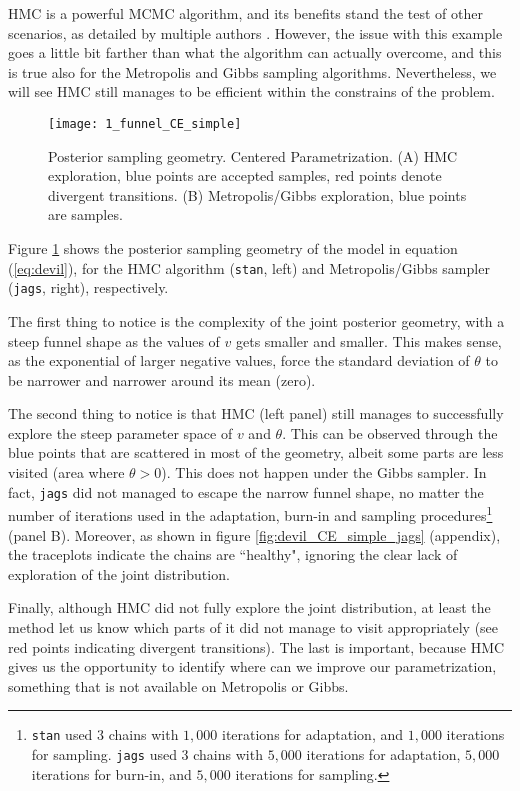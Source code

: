 HMC is a powerful MCMC algorithm, and its benefits stand the test of other scenarios, as detailed by multiple authors \cite{McElreath_2020, Gelman_et_al_2014}. However, the issue with this example goes a little bit farther than what the algorithm can actually overcome, and this is true also for the Metropolis and Gibbs sampling algorithms. Nevertheless, we will see HMC still manages to be efficient within the constrains of the problem.
%
\begin{figure}[h]
	\centering
	\texttt{[image: 1\_funnel\_CE\_simple]}
	\caption[Posterior sampling geometry. Centered Parametrization.]%
	{Posterior sampling geometry. Centered Parametrization. (A) HMC exploration, blue points are accepted samples, red points denote divergent transitions. (B) Metropolis/Gibbs exploration, blue points are samples.}
	\label{fig:devil_CE_geom}
\end{figure}

Figure \ref{fig:devil_CE_geom} shows the posterior sampling geometry of the model in equation (\ref{eq:devil}), for the HMC algorithm (\texttt{stan}, left) and Metropolis/Gibbs sampler (\texttt{jags}, right), respectively. 

The first thing to notice is the complexity of the joint posterior geometry, with a steep funnel shape as the values of $v$ gets smaller and smaller. This makes sense, as the exponential of larger negative values, force the standard deviation of $\theta$ to be narrower and narrower around its mean (zero). 

The second thing to notice is that HMC (left panel) still manages to successfully explore the steep parameter space of $v$ and $\theta$. This can be observed through the blue points that are scattered in most of the geometry, albeit some parts are less visited (area where $\theta>0$). This does not happen under the Gibbs sampler. In fact, \texttt{jags} did not managed to escape the narrow funnel shape, no matter the number of iterations used in the adaptation, burn-in and sampling procedures\footnote{\texttt{stan} used $3$ chains with $1,000$ iterations for adaptation, and $1,000$ iterations for sampling. \texttt{jags} used $3$ chains with $5,000$ iterations for adaptation, $5,000$ iterations for burn-in, and $5,000$ iterations for sampling.} (panel B). Moreover, as shown in figure \ref{fig:devil_CE_simple_jags} (appendix), the traceplots indicate the chains are ``healthy", ignoring the clear lack of exploration of the joint distribution.

Finally, although HMC did not fully explore the joint distribution, at least the method let us know which parts of it did not manage to visit appropriately (see red points indicating divergent transitions). The last is important, because HMC gives us the opportunity to identify where can we improve our parametrization, something that is not available on Metropolis or Gibbs.


